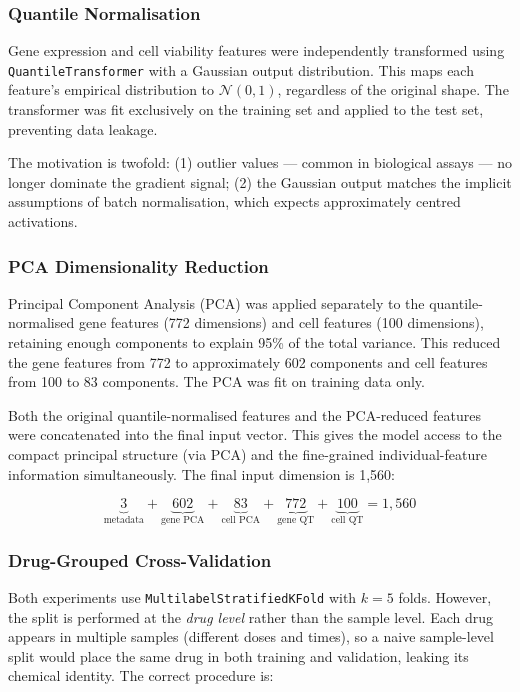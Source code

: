 \documentclass[12pt, a4paper]{article}
\begin{document}
\subsubsection{Quantile Normalisation}

Gene expression and cell viability features were independently transformed using \texttt{QuantileTransformer} with a Gaussian output distribution. This maps each feature's empirical distribution to $\mathcal{N}(0, 1)$, regardless of the original shape. The transformer was fit exclusively on the training set and applied to the test set, preventing data leakage.

The motivation is twofold: (1) outlier values — common in biological assays — no longer dominate the gradient signal; (2) the Gaussian output matches the implicit assumptions of batch normalisation, which expects approximately centred activations.

\subsubsection{PCA Dimensionality Reduction}

Principal Component Analysis (PCA) was applied separately to the quantile-normalised gene features (772 dimensions) and cell features (100 dimensions), retaining enough components to explain 95\% of the total variance. This reduced the gene features from 772 to approximately 602 components and cell features from 100 to 83 components. The PCA was fit on training data only.

Both the original quantile-normalised features and the PCA-reduced features were concatenated into the final input vector. This gives the model access to the compact principal structure (via PCA) and the fine-grained individual-feature information simultaneously. The final input dimension is 1,560:

\[
\underbrace{3}_{\text{metadata}} + \underbrace{602}_{\text{gene PCA}} + \underbrace{83}_{\text{cell PCA}} + \underbrace{772}_{\text{gene QT}} + \underbrace{100}_{\text{cell QT}} = 1{,}560
\]

\subsubsection{Drug-Grouped Cross-Validation}

Both experiments use \texttt{MultilabelStratifiedKFold} with $k=5$ folds. However, the split is performed at the \emph{drug level} rather than the sample level. Each drug appears in multiple samples (different doses and times), so a naive sample-level split would place the same drug in both training and validation, leaking its chemical identity. The correct procedure is:
\end{document}

